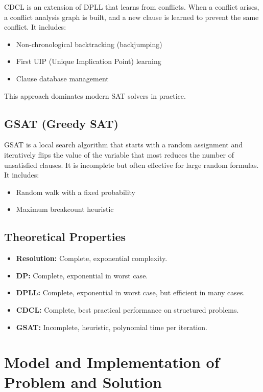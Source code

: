 \documentclass[11pt]{article}
\begin{document}
CDCL is an extension of DPLL that learns from conflicts. When a conflict arises, a conflict analysis graph is built, and a new clause is learned to prevent the same conflict. It includes:

\begin{itemize}
    \item Non-chronological backtracking (backjumping)
    \item First UIP (Unique Implication Point) learning
    \item Clause database management
\end{itemize}

This approach dominates modern SAT solvers in practice.

\subsection*{GSAT (Greedy SAT)}

GSAT is a local search algorithm that starts with a random assignment and iteratively flips the value of the variable that most reduces the number of unsatisfied clauses. It is incomplete but often effective for large random formulas. It includes:

\begin{itemize}
    \item Random walk with a fixed probability
    \item Maximum breakcount heuristic
\end{itemize}

\subsection*{Theoretical Properties}

\begin{itemize}
    \item \textbf{Resolution:} Complete, exponential complexity.
    \item \textbf{DP:} Complete, exponential in worst case.
    \item \textbf{DPLL:} Complete, exponential in worst case, but efficient in many cases.
    \item \textbf{CDCL:} Complete, best practical performance on structured problems.
    \item \textbf{GSAT:} Incomplete, heuristic, polynomial time per iteration.
\end{itemize}


\section{Model and Implementation of Problem and Solution}
\end{document}
